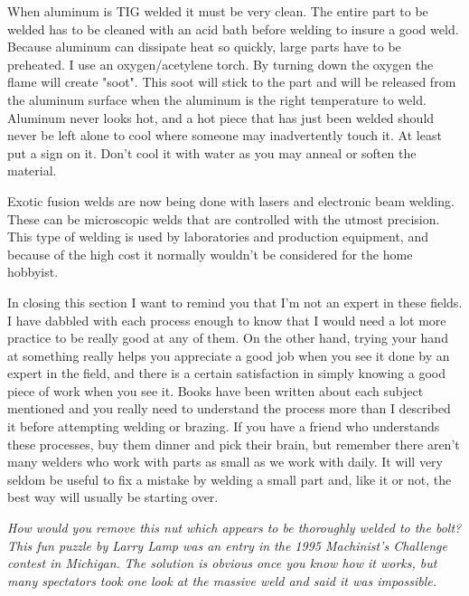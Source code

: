 
When aluminum is TIG welded it must be very clean. The entire part to be welded
has to be cleaned with an acid bath before welding to insure a good weld.
Because aluminum can dissipate heat so quickly, large parts have to be
preheated. I use an oxygen/acetylene torch. By turning down the oxygen the flame
will create "soot". This soot will stick to the part and will be released from
the aluminum surface when the aluminum is the right temperature to weld.
Aluminum never looks hot, and a hot piece that has just been welded should never
be left alone to cool where someone may inadvertently touch it. At least put a
sign on it. Don't cool it with water as you may anneal or soften the material.


Exotic fusion welds are now being done with lasers and electronic beam welding.
These can be microscopic welds that are controlled with the utmost precision.
This type of welding is used by laboratories and production equipment, and
because of the high cost it normally wouldn't be considered for the home
hobbyist.


In closing this section I want to remind you that I'm not an expert in these
fields. I have dabbled with each process enough to know that I would need a
lot more practice to be really good at any of them. On the other hand, trying
your hand at something really helps you appreciate a good job when you see it
done by an expert in the field, and there is a certain satisfaction in simply
knowing a good piece of work when you see it. Books have been written about each
subject mentioned and you really need to understand the process more than I
described it before attempting welding or brazing. If you have a friend who
understands these processes, buy them dinner and pick their brain, but remember
there aren't many welders who work with parts as small as we work with daily. It
will very seldom be useful to fix a mistake by welding a small part and, like it
or not, the best way will usually be starting over.

\bigskip
\textit{How would you remove this nut which appears to be thoroughly welded to
the bolt? This fun puzzle by Larry Lamp was an entry in the 1995 Machinist's
Challenge contest in Michigan.}
\bigskip
\textit{The solution is obvious once you know how it works, but many spectators
took one look at the massive weld and said it was impossible.}
\bigskip

\secup

\secup